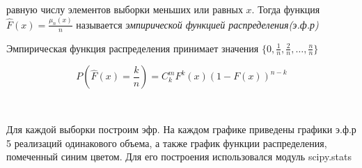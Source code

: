 \documentclass[a4paper,12pt, oneside]{book}
\begin{document}
равную числу элементов выборки меньших или равных $x$. Тогда функция $\hat{F}(x) = \frac{\mu_n (x)}{n} $ называется \textit{эмпирической функцией распределения(э.ф.р)}

\vspace{3mm}
Эмпирическая функция распределения принимает значения $\{0,\frac{1}{n}, \frac{2}{n}, \ldots, \frac{n}{n} \}$

$$
P(\hat{F}(x) = \frac{k}{n}) = C_k^m F^k (x)(1-F(x))^{{n-k}}
$$

\vspace{5mm}
\\
\vspace{5mm}



Для каждой выборки построим эфр. На каждом графике приведены графики э.ф.р 5 реализаций одинакового объема, а также график функции распределения, помеченный синим цветом.  Для его построения использовался модуль scipy.stats \\
\vspace{5mm}
\end{document}

